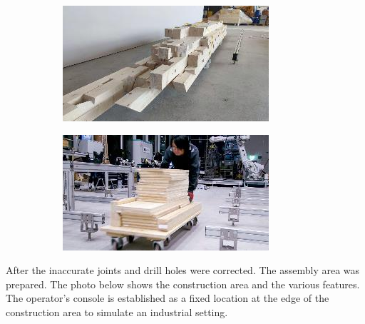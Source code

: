 \documentclass[11pt]{book}
\begin{document}
\begin{figure}[H]
\centering
\begin{subfigure}[b]{0.45\textwidth}
\centering
\includegraphics[width=\textwidth]{./images/image29.jpeg}
\end{subfigure}
\hfill
\begin{subfigure}[b]{0.45\textwidth}
\centering
\includegraphics[width=\textwidth]{./images/image30.jpeg}
\end{subfigure}
\end{figure}


After the inaccurate joints and drill holes were corrected. The assembly area was prepared. The photo below shows the construction area and the various features. The operator’s console is established as a fixed location at the edge of the construction area to simulate an industrial setting.
\end{document}
